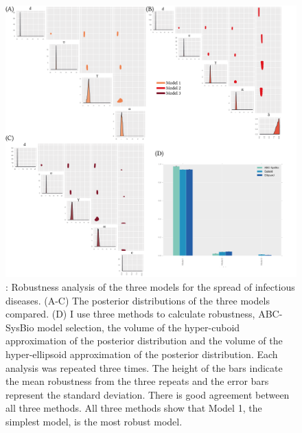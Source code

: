 \begin{figure}[p]
\begin{center}
\includegraphics[width=\textwidth]{../../chapters/chapterStabilityFinder/images/ex1_sum.png}
\caption[Robustness analysis of case study 1]{\label{fig:rob_sysbio1}: Robustness analysis of the three models for the spread of infectious diseases. (A-C) The posterior distributions of the three models compared. (D) I use three methods to calculate robustness, ABC-SysBio model selection, the volume of the hyper-cuboid approximation of the posterior distribution and the volume of the hyper-ellipsoid approximation of the posterior distribution. Each analysis was repeated three times. The height of the bars indicate the mean robustness from the three repeats and the error bars represent the standard deviation. There is good agreement between all three methods. All three methods show that Model 1, the simplest model, is the most robust model. }

\end{center}
\end{figure}

